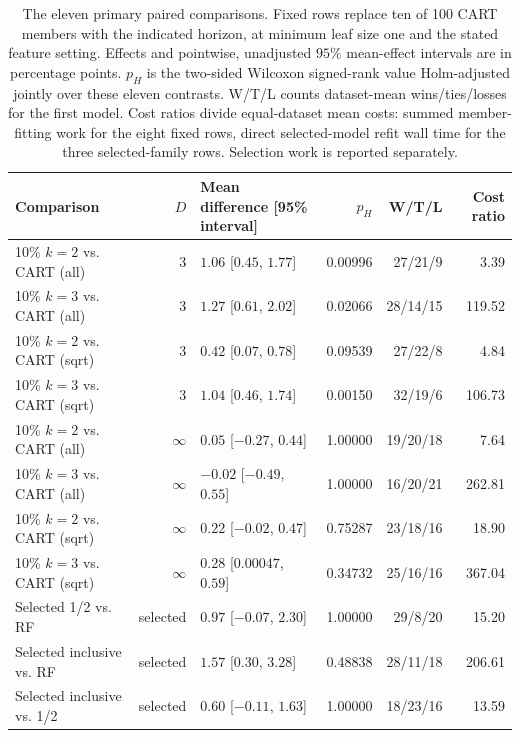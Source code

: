 \documentclass[final,5p,times]{elsarticle}
\begin{document}
\begin{table}[t]
\centering\small
\caption{The eleven primary paired comparisons. Fixed rows
replace ten of 100 CART members with the indicated horizon, at minimum
leaf size one and the stated feature setting. Effects and pointwise,
unadjusted $95\%$ mean-effect intervals are in percentage points.
$p_H$ is the two-sided Wilcoxon signed-rank value Holm-adjusted jointly
over these eleven contrasts.
W/T/L counts dataset-mean wins/ties/losses for the first model. Cost ratios
divide equal-dataset mean costs: summed member-fitting work for
the eight fixed rows, direct selected-model refit wall time for the three
selected-family rows. Selection work is reported separately.}
\label{tab:comparisons}
\begin{tabular}{@{}lrlrrr@{}}\toprule
Comparison & $D$ & Mean difference [95\% interval] & $p_H$ & W/T/L & Cost ratio\\
\midrule
10\% $k=2$ vs. CART (all) & 3 & $1.06$ [$0.45$, $1.77$] & 0.00996 & 27/21/9 & 3.39 \\
10\% $k=3$ vs. CART (all) & 3 & $1.27$ [$0.61$, $2.02$] & 0.02066 & 28/14/15 & 119.52 \\
10\% $k=2$ vs. CART (sqrt) & 3 & $0.42$ [$0.07$, $0.78$] & 0.09539 & 27/22/8 & 4.84 \\
10\% $k=3$ vs. CART (sqrt) & 3 & $1.04$ [$0.46$, $1.74$] & 0.00150 & 32/19/6 & 106.73 \\
10\% $k=2$ vs. CART (all) & $\infty$ & $0.05$ [$-0.27$, $0.44$] & 1.00000 & 19/20/18 & 7.64 \\
10\% $k=3$ vs. CART (all) & $\infty$ & $-0.02$ [$-0.49$, $0.55$] & 1.00000 & 16/20/21 & 262.81 \\
10\% $k=2$ vs. CART (sqrt) & $\infty$ & $0.22$ [$-0.02$, $0.47$] & 0.75287 & 23/18/16 & 18.90 \\
10\% $k=3$ vs. CART (sqrt) & $\infty$ & $0.28$ [$0.00047$, $0.59$] & 0.34732 & 25/16/16 & 367.04 \\
\midrule
Selected 1/2 vs. RF & selected & $0.97$ [$-0.07$, $2.30$] & 1.00000 & 29/8/20 & 15.20 \\
Selected inclusive vs. RF & selected & $1.57$ [$0.30$, $3.28$] & 0.48838 & 28/11/18 & 206.61 \\
Selected inclusive vs. 1/2 & selected & $0.60$ [$-0.11$, $1.63$] & 1.00000 & 18/23/16 & 13.59 \\
\bottomrule
\end{tabular}
\end{table}
\end{document}
